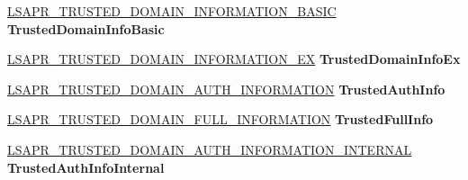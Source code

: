 \begin{DoxyCompactItemize}
\item 
\mbox{\label{union___l_s_a_p_r___t_r_u_s_t_e_d___d_o_m_a_i_n___i_n_f_o_a2540422ec8fe6ecc8e7a4113d1f6fff7}} 
\hyperlink{struct___l_s_a_p_r___t_r_u_s_t___i_n_f_o_r_m_a_t_i_o_n}{L\+S\+A\+P\+R\+\_\+\+T\+R\+U\+S\+T\+E\+D\+\_\+\+D\+O\+M\+A\+I\+N\+\_\+\+I\+N\+F\+O\+R\+M\+A\+T\+I\+O\+N\+\_\+\+B\+A\+S\+IC} {\bfseries Trusted\+Domain\+Info\+Basic}
\item 
\mbox{\label{union___l_s_a_p_r___t_r_u_s_t_e_d___d_o_m_a_i_n___i_n_f_o_a0c45bb0eeaf8ed4ede24139eb5da16d3}} 
\hyperlink{struct___l_s_a_p_r___t_r_u_s_t_e_d___d_o_m_a_i_n___i_n_f_o_r_m_a_t_i_o_n___e_x}{L\+S\+A\+P\+R\+\_\+\+T\+R\+U\+S\+T\+E\+D\+\_\+\+D\+O\+M\+A\+I\+N\+\_\+\+I\+N\+F\+O\+R\+M\+A\+T\+I\+O\+N\+\_\+\+EX} {\bfseries Trusted\+Domain\+Info\+Ex}
\item 
\mbox{\label{union___l_s_a_p_r___t_r_u_s_t_e_d___d_o_m_a_i_n___i_n_f_o_aad2d9f5b6040bdc81ce10175b874568f}} 
\hyperlink{struct___l_s_a_p_r___t_r_u_s_t_e_d___d_o_m_a_i_n___a_u_t_h___i_n_f_o_r_m_a_t_i_o_n}{L\+S\+A\+P\+R\+\_\+\+T\+R\+U\+S\+T\+E\+D\+\_\+\+D\+O\+M\+A\+I\+N\+\_\+\+A\+U\+T\+H\+\_\+\+I\+N\+F\+O\+R\+M\+A\+T\+I\+ON} {\bfseries Trusted\+Auth\+Info}
\item 
\mbox{\label{union___l_s_a_p_r___t_r_u_s_t_e_d___d_o_m_a_i_n___i_n_f_o_a3544f093c1d12498bd3bfefbc5869da0}} 
\hyperlink{struct___l_s_a_p_r___t_r_u_s_t_e_d___d_o_m_a_i_n___f_u_l_l___i_n_f_o_r_m_a_t_i_o_n}{L\+S\+A\+P\+R\+\_\+\+T\+R\+U\+S\+T\+E\+D\+\_\+\+D\+O\+M\+A\+I\+N\+\_\+\+F\+U\+L\+L\+\_\+\+I\+N\+F\+O\+R\+M\+A\+T\+I\+ON} {\bfseries Trusted\+Full\+Info}
\item 
\mbox{\label{union___l_s_a_p_r___t_r_u_s_t_e_d___d_o_m_a_i_n___i_n_f_o_a58116b4857f604817546ce1bad016c8f}} 
\hyperlink{struct___l_s_a_p_r___t_r_u_s_t_e_d___d_o_m_a_i_n___a_u_t_h___i_n_f_o_r_m_a_t_i_o_n___i_n_t_e_r_n_a_l}{L\+S\+A\+P\+R\+\_\+\+T\+R\+U\+S\+T\+E\+D\+\_\+\+D\+O\+M\+A\+I\+N\+\_\+\+A\+U\+T\+H\+\_\+\+I\+N\+F\+O\+R\+M\+A\+T\+I\+O\+N\+\_\+\+I\+N\+T\+E\+R\+N\+AL} {\bfseries Trusted\+Auth\+Info\+Internal}
\item 

\end{DoxyCompactItemize}
